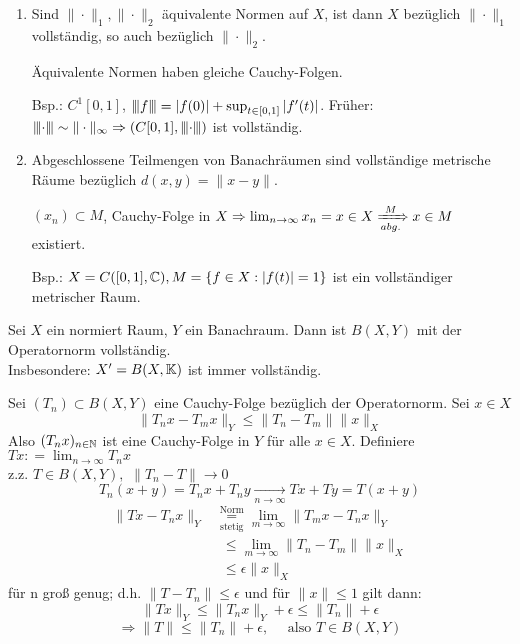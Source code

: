\begin{bemerkung}
	\begin{enumerate}[label=\alph*\upshape)]
		\item Sind $\| \cdot \|_{1}, \| \cdot \|_{2}$ äquivalente Normen auf $X$, ist dann $X$ bezüglich $\| \cdot \|_{1}$ vollständig, so auch bezüglich $\| \cdot \|_{2}$.
			\begin{beweis}
				Äquivalente Normen haben gleiche Cauchy-Folgen.
			\end{beweis}
			Bsp.: $C^{1}[0, 1]$, ${\left\vert\kern-0.25ex\left\vert\kern-0.25ex\left\vert f\right\vert\kern-0.25ex\right\vert\kern-0.25ex\right\vert} = |f(0)| + \sup_{t \in [0, 1]} | f'(t) |$. Früher: ${\left\vert\kern-0.25ex\left\vert\kern-0.25ex\left\vert\cdot\right\vert\kern-0.25ex\right\vert\kern-0.25ex\right\vert} \sim \| \cdot \|_{\infty} \Rightarrow \left( C[0, 1], {\left\vert\kern-0.25ex\left\vert\kern-0.25ex\left\vert\cdot\right\vert\kern-0.25ex\right\vert\kern-0.25ex\right\vert} \right)$ ist vollständig.
		\item Abgeschlossene Teilmengen von 	Banachräumen sind vollständige metrische Räume bezüglich $d(x, y) = \| x - y\|$.
			\begin{beweis}
				$(x_{n}) \subset M$, Cauchy-Folge in $X \Rightarrow \lim_{n \rightarrow \infty} x_{n} = x \in X \xRightarrow[abg.]{M} x \in M$ existiert.	
			\end{beweis}
			Bsp.: $X = C([0, 1], \mathbb{C}), M = \{ f \in X: |f ( t )| = 1 \}$ ist ein vollständiger metrischer Raum.
	\end{enumerate}
\end{bemerkung}


\begin{satz} \label{satz:5.6}
	Sei $X$ ein normiert Raum, $Y$ ein Banachraum.
	Dann ist $B(X, Y)$ mit der Operatornorm vollständig. \\
	Insbesondere: $X' = B(X, \mathbb{K})$ ist immer  vollständig.
\end{satz}

\begin{beweis}
	Sei $(T_{n}) \subset B(X, Y)$ eine Cauchy-Folge bezüglich der Operatornorm. Sei $x \in X$
	\[ \| T_{n} x - T_{m} x \|_{Y} \leq \| T_{n} - T_{m} \| \|x\|_{X} \]
	Also $(T_{n}x)_{n \in \mathbb{N}}$ ist eine Cauchy-Folge in $Y$ für alle $x \in X$. Definiere $T x : = \lim_{n \rightarrow \infty} T_{n} x$ \\
	z.z. $T \in B(X, Y),$ $\| T_{n} - T \| \rightarrow 0$ \\
	\[ T_{n} (x + y)  = T_{n} x + T_{n} y \xrightarrow[n \rightarrow \infty]{} Tx + Ty = T(x + y) \]
	\begin{align*}
		\| Tx - T_{n}x \|_{Y} & \underset{\text{stetig}}{\overset{\text{Norm}}{=}} \lim_{m \rightarrow \infty} \| T_{m} x - T_{n} x \|_{Y} \\
		 & ~~ \leq \lim_{m \rightarrow \infty} \| T_{n} - T_{m} \| \| x \|_{X} \\
		 & ~~ \leq \epsilon \| x \|_{X}
	\end{align*}
	für n gro{\ss} genug; d.h. $\| T - T_{n} \| \leq \epsilon$ und für $\| x \| \leq 1$ gilt dann:
	\[ \| T x \|_{Y} \leq \| T_{n} x \|_{Y} + \epsilon \leq \| T_{n} \| + \epsilon  \]
	\[ \Rightarrow \| T \| \leq \| T_{n} \| + \epsilon, \quad \text{ also } T \in B(X, Y) \]
\end{beweis}


